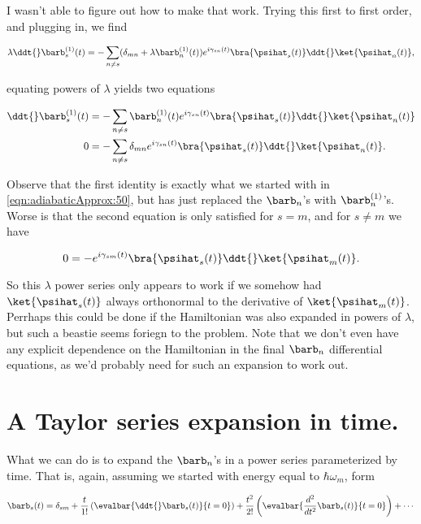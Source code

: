 I wasn't able to figure out how to make that work.  Trying this first to first order, and plugging in, we find

\begin{equation}\label{eqn:adiabaticApprox:170}
\lambda \ddt{} \barb^{(1)}_s(t) = - \sum_{n \ne s} ( \delta_{mn} + \lambda \barb^{(1)}_n(t) ) 
e^{i \gamma_{sn}(t) } \bra{\psihat_s(t)} \ddt{} \ket{\psihat_n(t)},
\end{equation}

equating powers of $\lambda$ yields two equations

\begin{align}\label{eqn:adiabaticApprox:190}
\ddt{} \barb_s^{(1)}(t) &= - \sum_{n \ne s} \barb^{(1)}_n(t) e^{i \gamma_{sn}(t) } \bra{\psihat_s(t)} \ddt{} \ket{\psihat_n(t)} \\
0 &= - \sum_{n \ne s} \delta_{mn} e^{i \gamma_{sn}(t) } \bra{\psihat_s(t)} \ddt{} \ket{\psihat_n(t)}.
\end{align}

Observe that the first identity is exactly what we started with in \ref{eqn:adiabaticApprox:50}, but has just replaced the $\barb_n$'s with $\barb^{(1)}_n$'s.  Worse is that the second equation is only satisfied for $s = m$, and for $s \ne m$ we have

\begin{equation}\label{eqn:adiabaticApprox:n}
0 = - e^{i \gamma_{sm}(t) } \bra{\psihat_s(t)} \ddt{} \ket{\psihat_m(t)}.
\end{equation}

So this $\lambda$ power series only appears to work if we somehow had $\ket{\psihat_s(t)}$ always orthonormal to the derivative of $\ket{\psihat_m(t)}$.  Perrhaps this could be done if the Hamiltonian was also expanded in powers of $\lambda$, but such a beastie seems foriegn to the problem.  Note that we don't even have any explicit dependence on the Hamiltonian in the final $\barb_n$ differential equations, as we'd probably need for such an expansion to work out.

\section{A Taylor series expansion in time.}

What we can do is to expand the $\barb_n$'s in a power series parameterized by time.  That is, again, assuming we started with energy equal to $\hbar \omega_m$, form

\begin{equation}\label{eqn:adiabaticApprox:n}
\barb_s(t) 
= \delta_{sm} 
+ \frac{t}{1!} \left( \evalbar{ \ddt{}\barb_s(t) }{t=0} \right)
+ \frac{t^2}{2!} \left( \evalbar{ \frac{d^2}{dt^2} \barb_s(t) }{t=0} \right)
+ \cdots
\end{equation}

